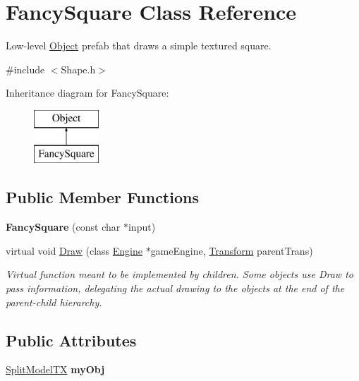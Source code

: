 \hypertarget{class_fancy_square}{}\section{Fancy\+Square Class Reference}
\label{class_fancy_square}


Low-\/level \hyperlink{class_object}{Object} prefab that draws a simple textured square.  




{\ttfamily \#include $<$Shape.\+h$>$}

Inheritance diagram for Fancy\+Square\+:\begin{figure}[H]
\begin{center}
\leavevmode
\includegraphics[height=2.000000cm]{class_fancy_square}
\end{center}
\end{figure}
\subsection*{Public Member Functions}
\begin{DoxyCompactItemize}
\item 
\hypertarget{class_fancy_square_a2ddb3b7be2421b2f6753ed6bb747f2ea}{}\label{class_fancy_square_a2ddb3b7be2421b2f6753ed6bb747f2ea} 
{\bfseries Fancy\+Square} (const char $\ast$input)
\item 
virtual void \hyperlink{class_fancy_square_ac77d35ba8ab766f8a3e35f68e7344953}{Draw} (class \hyperlink{class_engine}{Engine} $\ast$game\+Engine, \hyperlink{class_transform}{Transform} parent\+Trans)
\begin{DoxyCompactList}\small\item\em Virtual function meant to be implemented by children. Some objects use Draw to pass information, delegating the actual drawing to the objects at the end of the parent-\/child hierarchy. \end{DoxyCompactList}\end{DoxyCompactItemize}
\subsection*{Public Attributes}
\begin{DoxyCompactItemize}
\item 
\hypertarget{class_fancy_square_ae08622ddfab2e5c59a2af7978b10b0fc}{}\label{class_fancy_square_ae08622ddfab2e5c59a2af7978b10b0fc} 
\hyperlink{class_split_model_t_x}{Split\+Model\+TX} {\bfseries my\+Obj}
\end{DoxyCompactItemize}


